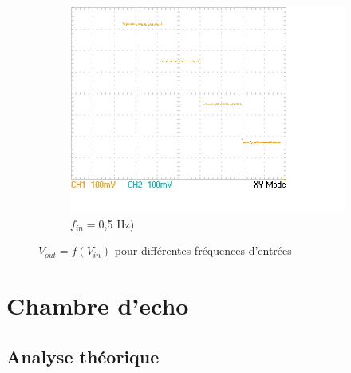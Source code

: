 \documentclass{article}
\begin{document}
\begin{figure}[h!]
\begin{subfigure}[b]{0.3\textwidth}
    \centering
    \includegraphics[width=\textwidth]{data/TEK0020_}
    \caption{$f_{in}=$0,5 Hz)}
    \label{fig:fastXY}
  \end{subfigure}
  \hfill  \caption{$V_{out}=f(V_{in})$ pour différentes fréquences d'entrées}
  \label{fig:slow}
\end{figure}




\section{Chambre d'echo}
\subsection{Analyse théorique}
\end{document}
